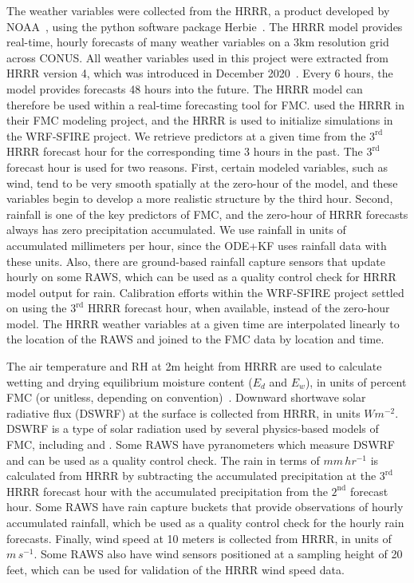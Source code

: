 \documentclass[fire,article,submit,pdftex,moreauthors]{Definitions/mdpi}
\begin{document}
The weather variables were collected from the HRRR, a product developed by NOAA~\citep{Dowell-2022-THR}, using the python software package Herbie~\citep{Blaylock-2024-HRM}. The HRRR model provides real-time, hourly forecasts of many weather variables on a 3km resolution grid across CONUS. All weather variables used in this project were extracted from HRRR version 4, which was introduced in December 2020~\citep{Dowell-2022-THR}. Every 6 hours, the model provides forecasts 48 hours into the future. The HRRR model can therefore be used within a real-time forecasting tool for FMC. \citet{Schreck-2023-MLV} used the HRRR in their FMC modeling project, and the HRRR is used to initialize simulations in the WRF-SFIRE project. We retrieve predictors at a given time from the $3^{\text{rd}}$ HRRR forecast hour for the corresponding time 3 hours in the past. The $3^{\text{rd}}$ forecast hour is used for two reasons. First, certain modeled variables, such as wind, tend to be very smooth spatially at the zero-hour of the model, and these variables begin to develop a more realistic structure by the third hour. Second, rainfall is one of the key predictors of FMC, and the zero-hour of HRRR forecasts always has zero precipitation accumulated. We use rainfall in units of accumulated millimeters per hour, since the ODE+KF uses rainfall data with these units. Also, there are ground-based rainfall capture sensors that update hourly on some RAWS, which can be used as a quality control check for HRRR model output for rain. Calibration efforts within the WRF-SFIRE project settled on using the $3^{\text{rd}}$ HRRR forecast hour, when available, instead of the zero-hour model. The HRRR weather variables at a given time are interpolated linearly to the location of the RAWS and joined to the FMC data by location and time. 

The air temperature and RH at 2m height from HRRR are used to calculate wetting and drying equilibrium moisture content ($E_d$ and $E_w$), in units of percent FMC (or unitless, depending on convention)~\citep[Eqs.\ 4 and 5,][]{VanWagner-1985-EFP}. Downward shortwave solar radiative flux (DSWRF) at the surface is collected from HRRR, in units $W m^{-2}$. DSWRF is a type of solar radiation used by several physics-based models of FMC, including \citet{Nelson-2000-PDC} and \citet{vanderKamp-2017-MFS}. Some RAWS have pyranometers which measure DSWRF and can be used as a quality control check. The rain in terms of $mm\,hr^{-1}$ is calculated from HRRR by subtracting the accumulated precipitation at the $3^{\text{rd}}$ HRRR forecast hour with the accumulated precipitation from the $2^{\text{nd}}$ forecast hour. Some RAWS have rain capture buckets that provide observations of hourly accumulated rainfall, which be used as a quality control check for the hourly rain forecasts. Finally, wind speed at 10 meters is collected from HRRR, in units of $m\,s^{-1}$. Some RAWS also have wind sensors positioned at a sampling height of 20 feet, which can be used for validation of the HRRR wind speed data.
\end{document}
